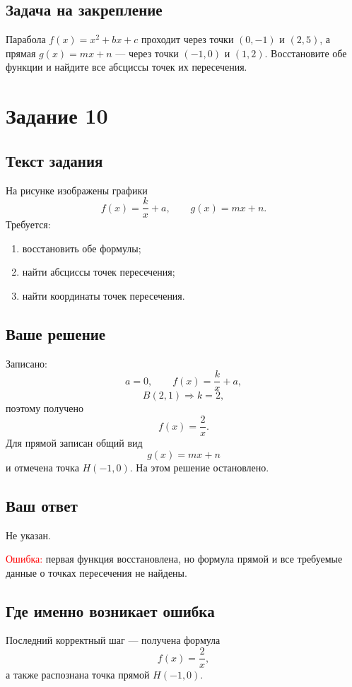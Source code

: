 \documentclass[12pt,a4paper]{article}
\begin{document}
\subsection*{Задача на закрепление}
Парабола \(f(x)=x^2+bx+c\) проходит через точки \((0,-1)\) и \((2,5)\), а прямая \(g(x)=mx+n\) --- через точки \((-1,0)\) и \((1,2)\). Восстановите обе функции и найдите все абсциссы точек их пересечения.

\newpage
{}\label{task:10}
\section*{Задание 10}

\subsection*{Текст задания}
На рисунке изображены графики
\[
  f(x)=\frac{k}{x}+a, \qquad g(x)=mx+n.
\]
Требуется:
\begin{enumerate}
  \item восстановить обе формулы;
  \item найти абсциссы точек пересечения;
  \item найти координаты точек пересечения.
\end{enumerate}

\subsection*{Ваше решение}
Записано:
\[
  a=0, \qquad f(x)=\frac{k}{x}+a,
\]
\[
  B(2,1) \Rightarrow k=2,
\]
поэтому получено
\[
  f(x)=\frac{2}{x}.
\]
Для прямой записан общий вид
\[
  g(x)=mx+n
\]
и отмечена точка \(H(-1,0)\). На этом решение остановлено.

\subsection*{Ваш ответ}
Не указан.

\textcolor{red}{Ошибка:} первая функция восстановлена, но формула прямой и все требуемые данные о точках пересечения не найдены.

\subsection*{Где именно возникает ошибка}
Последний корректный шаг --- получена формула
\[
  f(x)=\frac{2}{x},
\]
а также распознана точка прямой \(H(-1,0)\).
\end{document}
